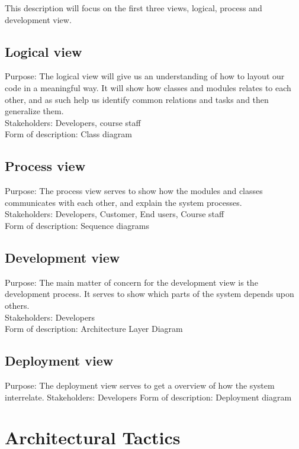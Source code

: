 \documentclass[11pt]{book}
\begin{document}
This description will focus on the first three views, logical, process and development view.

\subsection{Logical view}\label{subsec:logicalViewDescription}
Purpose: The logical view will give us an understanding of how to layout our code in a meaningful way. It will show how classes and modules relates to each other, and as such help us identify common relations and tasks and then generalize them.\\
Stakeholders: Developers, course staff\\
Form of description: Class diagram

\subsection{Process view}\label{subsec:processViewDescription}
Purpose: The process view serves to show how the modules and classes communicates with each other, and explain the system processes.\\
Stakeholders: Developers, Customer, End users, Course staff\\
Form of description: Sequence diagrams

\subsection{Development view}\label{subsec:developmentViewDescription}
Purpose: The main matter of concern for the development view is the development process. It serves to show which parts of the system depends upon others. \\
Stakeholders: Developers\\
Form of description: Architecture Layer Diagram

\subsection{Deployment view}\label{subsec:deploymentViewDescription}
Purpose: The deployment view serves to get a overview of how the system interrelate.
Stakeholders: Developers
Form of description: Deployment diagram

\section{Architectural Tactics}
\end{document}
